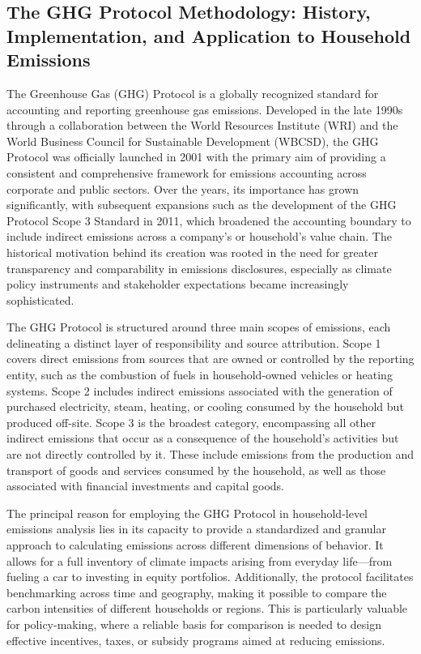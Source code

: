 \documentclass[12pt,a4paper]{article}
\begin{document}
\subsection{The GHG Protocol Methodology: History, Implementation, and Application to Household Emissions}

The Greenhouse Gas (GHG) Protocol is a globally recognized standard for accounting and reporting greenhouse gas emissions. Developed in the late 1990s through a collaboration between the World Resources Institute (WRI) and the World Business Council for Sustainable Development (WBCSD), the GHG Protocol was officially launched in 2001 with the primary aim of providing a consistent and comprehensive framework for emissions accounting across corporate and public sectors. Over the years, its importance has grown significantly, with subsequent expansions such as the development of the GHG Protocol Scope 3 Standard in 2011, which broadened the accounting boundary to include indirect emissions across a company’s or household’s value chain. The historical motivation behind its creation was rooted in the need for greater transparency and comparability in emissions disclosures, especially as climate policy instruments and stakeholder expectations became increasingly sophisticated.

The GHG Protocol is structured around three main scopes of emissions, each delineating a distinct layer of responsibility and source attribution. Scope 1 covers direct emissions from sources that are owned or controlled by the reporting entity, such as the combustion of fuels in household-owned vehicles or heating systems. Scope 2 includes indirect emissions associated with the generation of purchased electricity, steam, heating, or cooling consumed by the household but produced off-site. Scope 3 is the broadest category, encompassing all other indirect emissions that occur as a consequence of the household’s activities but are not directly controlled by it. These include emissions from the production and transport of goods and services consumed by the household, as well as those associated with financial investments and capital goods.

The principal reason for employing the GHG Protocol in household-level emissions analysis lies in its capacity to provide a standardized and granular approach to calculating emissions across different dimensions of behavior. It allows for a full inventory of climate impacts arising from everyday life—from fueling a car to investing in equity portfolios. Additionally, the protocol facilitates benchmarking across time and geography, making it possible to compare the carbon intensities of different households or regions. This is particularly valuable for policy-making, where a reliable basis for comparison is needed to design effective incentives, taxes, or subsidy programs aimed at reducing emissions.
\end{document}
